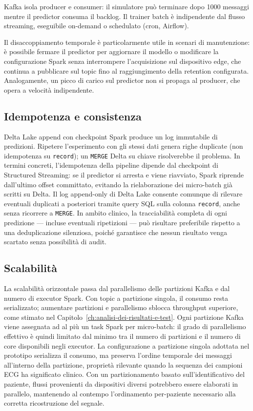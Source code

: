 Kafka isola producer e consumer: il simulatore può terminare dopo 1000 messaggi mentre il predictor consuma il backlog.
Il trainer batch è indipendente dal flusso streaming, eseguibile on-demand o schedulato (cron, Airflow).

Il disaccoppiamento temporale è particolarmente utile in scenari di manutenzione: è possibile fermare il predictor per aggiornare il modello o modificare la configurazione Spark senza interrompere l'acquisizione sul dispositivo edge, che continua a pubblicare sul topic fino al raggiungimento della retention configurata.
Analogamente, un picco di carico sul predictor non si propaga al producer, che opera a velocità indipendente.

\subsection{Idempotenza e consistenza}

Delta Lake append con checkpoint Spark produce un log immutabile di predizioni.
Ripetere l'esperimento con gli stessi dati genera righe duplicate (non idempotenza su \texttt{record}); un \texttt{MERGE} Delta su chiave risolverebbe il problema.
In termini concreti, l'idempotenza della pipeline dipende dal checkpoint di Structured Streaming: se il predictor si arresta e viene riavviato, Spark riprende dall'ultimo offset committato, evitando la rielaborazione dei micro-batch già scritti su Delta.
Il log append-only di Delta Lake consente comunque di rilevare eventuali duplicati a posteriori tramite query SQL sulla colonna \texttt{record}, anche senza ricorrere a \texttt{MERGE}.
In ambito clinico, la tracciabilità completa di ogni predizione --- incluse eventuali ripetizioni --- può risultare preferibile rispetto a una deduplicazione silenziosa, poiché garantisce che nessun risultato venga scartato senza possibilità di audit.

\subsection{Scalabilità}

La scalabilità orizzontale passa dal parallelismo delle partizioni Kafka e dal numero di executor Spark.
Con topic a partizione singola, il consumo resta serializzato; aumentare partizioni e parallelismo sblocca throughput superiore, come stimato nel Capitolo~\ref{ch:analisi-dei-risultati-e-test}.
Ogni partizione Kafka viene assegnata ad al più un task Spark per micro-batch: il grado di parallelismo effettivo è quindi limitato dal minimo tra il numero di partizioni e il numero di core disponibili negli executor.
La configurazione a partizione singola adottata nel prototipo serializza il consumo, ma preserva l'ordine temporale dei messaggi all'interno della partizione, proprietà rilevante quando la sequenza dei campioni ECG ha significato clinico.
Con un partizionamento basato sull'identificativo del paziente, flussi provenienti da dispositivi diversi potrebbero essere elaborati in parallelo, mantenendo al contempo l'ordinamento per-paziente necessario alla corretta ricostruzione del segnale.

